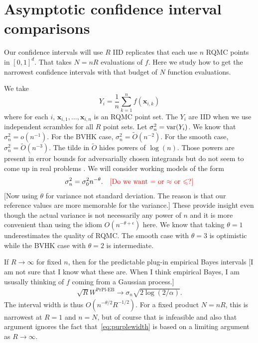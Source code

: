 \documentclass{article}
\newcommand{\art}[1]{\begingroup\color{blue}#1\endgroup}
\newcommand{\fred}[1]{\begingroup\color{red}#1\endgroup}
\renewcommand{\le}{\leqslant}
\newcommand{\e}{\mathbb{E}}
\newcommand{\bsx}{\boldsymbol{x}}
\newcommand{\giv}{\!\mid\!} %
\newcommand{\prpleb}{\text{PrPl-EB}}
\begin{document}

\section{Asymptotic confidence interval comparisons}\label{sec:asymptotic}

Our confidence intervals will use $R$ IID replicates that each
use $n$ RQMC points in $[0,1]^d$.  That takes $N=nR$
evaluations of $f$. 
Here we study how to get the narrowest confidence
intervals with that budget of $N$ function evaluations.

We take 
$$Y_i=\frac1n\sum_{k=1}^nf(\bsx_{i,k})$$
where for each $i$, $\bsx_{i,1},\dots,\bsx_{i,n}$ is an RQMC
point set. The $Y_i$ are IID when we use independent
scrambles for all $R$ point sets. Let $\sigma^2_n = \operatorname{var}(Y_i)$.
We know that $\sigma^2_n = o(n^{-1}).$
For the BVHK case, $\sigma^2_n=\tilde O(n^{-2})$.  
For the smooth case,
$\sigma^2_n=\tilde O(n^{-3})$.  
The tilde in $\tilde O$ hides powers of $\log(n)$.
Those powers are present in error bounds for adversarially
chosen integrands but do not seem to come up in
real problems \cite{schl:2002,wherearethelogs}.
We will consider working
models of the form
\begin{align}\label{eq:themodel}
\sigma^2_n = \sigma^2_0n^{-\theta}.  \fred{\quad \text{[Do we want $=$ or $\approx$ or $\le$?]}}
\end{align}
\art{[Now using $\theta$ for variance not standard deviation.
The reason is that our reference values are more memorable
for the variance.]}
These provide insight even though the actual variance is not
necessarily any power of $n$ and it is more convenient
than using the idiom $O(n^{-\theta+\epsilon})$ here.
We know that taking $\theta=1$ underestimates
the quality of RQMC. The smooth case with $\theta = 3$ is optimistic
while the BVHK case with $\theta=2$ is intermediate.

If $R\to\infty$ for fixed $n$, then for the predictable
plug-in empirical Bayes intervals \fred{[I am not sure that I know what these are.  When I think empirical Bayes, I am ususally thinking of $f$ coming from a Gaussian process.]}
\begin{align}\label{eq:purplewidth}
\sqrt{R}W^\prpleb\to \sigma_n\sqrt{2\log(2/\alpha)}.
\end{align}
The interval width is thus $O(n^{-\theta/2}R^{-1/2})$.
For a fixed product $N=nR$, this is narrowest at $R=1$
and $n=N$, but of course that is infeasible and also
that argument ignores the fact that~\eqref{eq:purplewidth}
is based on a limiting argument as $R\to\infty$.
\end{document}
